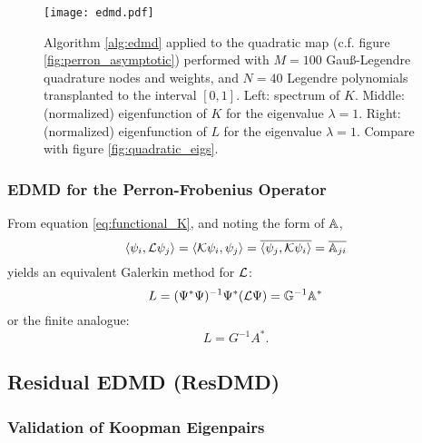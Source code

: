 \begin{figure}
    \centering
    \texttt{[image: edmd.pdf]}
    \caption{
        Algorithm \ref{alg:edmd} applied to the quadratic map (c.f. figure 
        \ref{fig:perron_asymptotic}) performed with $M = 100$ Gauß-Legendre quadrature 
        nodes and weights, and $N = 40$ Legendre polynomials transplanted to the interval 
        $[0, 1]$. Left: spectrum of $K$. Middle: (normalized) eigenfunction of $K$ for 
        the eigenvalue $\lambda = 1$. Right: (normalized) eigenfunction of $L$ for the 
        eigenvalue $\lambda = 1$. Compare with figure \ref{fig:quadratic_eigs}. 
    }\label{fig:edmd}
\end{figure}


\subsubsection{EDMD for the Perron-Frobenius Operator}

From equation \ref{eq:functional_K}, and noting the form of $\mathbb{A}$, 
\begin{equation}
    \left\langle \psi_i, \mathcal{L} \psi_j \right\rangle 
    = \left\langle \mathcal{K} \psi_i, \psi_j \right\rangle 
    = \overline{ \left\langle \psi_j, \mathcal{K} \psi_i \right\rangle } 
    = \overline{\mathbb{A}_{j i}}
\end{equation}
yields an equivalent Galerkin method for $\mathcal{L}$:
\begin{equation}
    L = (\Psi^* \Psi)^{-1} \Psi^* (\mathcal{L} \Psi) = \mathbb{G}^{-1} \mathbb{A}^* 
\end{equation}
or the finite analogue:
\begin{equation}
    L = G^{-1} A^* . 
\end{equation}

\subsection{Residual EDMD (ResDMD)}


\subsubsection{Validation of Koopman Eigenpairs}\label{sec:validation}

